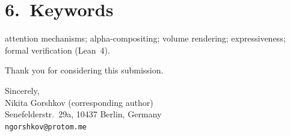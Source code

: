\documentclass[11pt]{article}
\begin{document}
\section*{6.~Keywords}
attention mechanisms; alpha-compositing; volume rendering; expressiveness; formal
verification (Lean~4).

\bigskip
\noindent Thank you for considering this submission.

\bigskip
\noindent Sincerely,\\[0.5em]
Nikita Gorshkov (corresponding author)\\
Senefelderstr.\ 29a, 10437 Berlin, Germany\\
\texttt{ngorshkov@protom.me}
\end{document}
